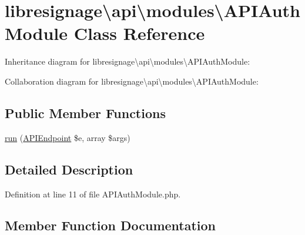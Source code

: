 \hypertarget{classlibresignage_1_1api_1_1modules_1_1APIAuthModule}{}\section{libresignage\textbackslash{}api\textbackslash{}modules\textbackslash{}A\+P\+I\+Auth\+Module Class Reference}
\label{classlibresignage_1_1api_1_1modules_1_1APIAuthModule}


Inheritance diagram for libresignage\textbackslash{}api\textbackslash{}modules\textbackslash{}A\+P\+I\+Auth\+Module\+:


Collaboration diagram for libresignage\textbackslash{}api\textbackslash{}modules\textbackslash{}A\+P\+I\+Auth\+Module\+:
\subsection*{Public Member Functions}
\begin{DoxyCompactItemize}
\item 
\hyperlink{classlibresignage_1_1api_1_1modules_1_1APIAuthModule_a2204a9888375456924728b06a6ec5c70}{run} (\hyperlink{classlibresignage_1_1api_1_1APIEndpoint}{A\+P\+I\+Endpoint} \$e, array \$args)
\end{DoxyCompactItemize}


\subsection{Detailed Description}


Definition at line 11 of file A\+P\+I\+Auth\+Module.\+php.



\subsection{Member Function Documentation}
\mbox{\label{classlibresignage_1_1api_1_1modules_1_1APIAuthModule_a2204a9888375456924728b06a6ec5c70}} 
